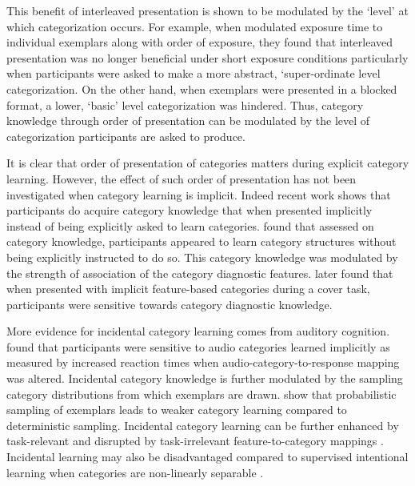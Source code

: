 This benefit of interleaved presentation is shown to be modulated by the `level' at which categorization occurs. For example, when \cite{mack2015dynamics} modulated exposure time to individual exemplars along with order of exposure, they found that interleaved presentation was no longer beneficial under short exposure conditions particularly when participants were asked to make a more abstract, `super-ordinate level categorization. On the other hand, when exemplars were presented in a blocked format, a lower, `basic' level categorization was hindered. Thus, category knowledge through order of presentation can be modulated by the level of categorization participants are asked to produce.

It is clear that order of presentation of categories matters during explicit category learning. However, the effect of such order of presentation has not been investigated when category learning is implicit. Indeed recent work shows that participants do acquire category knowledge that when presented implicitly instead of being explicitly asked to learn categories. \cite{unger2022ready} found that assessed on category knowledge, participants appeared to learn category structures without being explicitly instructed to do so. This category knowledge was modulated by the strength of association of the category diagnostic features. \cite{unger2023without} later found that when presented with implicit feature-based categories during a cover task, participants were sensitive towards category diagnostic knowledge. 

More evidence for incidental category learning comes from auditory cognition. \cite{gabay2015incidental} found that participants were sensitive to audio categories learned implicitly as measured by increased reaction times when audio-category-to-response mapping was altered. Incidental category knowledge is further modulated by the sampling category distributions from which exemplars are drawn. \cite{roark2018task} show that probabilistic sampling of exemplars leads to weaker category learning compared to deterministic sampling. Incidental category learning can be further enhanced by task-relevant and disrupted by task-irrelevant feature-to-category mappings \parencite{roark2022representational}. Incidental learning may also be disadvantaged compared to supervised intentional learning when categories are non-linearly separable \parencite{love2002comparing}.

